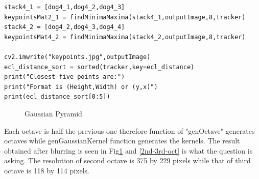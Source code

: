 \documentclass[12pt]{article}
\newenvironment{QandA}
{
	\begin{enumerate}[label=\normalfont\arabic*.,leftmargin=2em,rightmargin=2em]\normalfont
	}
	{
	\end{enumerate}
}
\newenvironment{codelalala}{}{}
\newenvironment{answered}{\setlength{\parindent}{1em}\par\normalfont}{}
\begin{document}
\begin{QandA}
\begin{answered}
\begin{codelalala}
\begin{verbatim}
stack4_1 = [dog4_1,dog4_2,dog4_3]
keypointsMat2_1 = findMinimaMaxima(stack4_1,outputImage,8,tracker)
stack4_2 = [dog4_2,dog4_3,dog4_4]
keypointsMat4_2 = findMinimaMaxima(stack4_2,outputImage,8,tracker)

cv2.imwrite("keypoints.jpg",outputImage)
ecl_distance_sort = sorted(tracker,key=ecl_distance)
print("Closest five points are:")
print("Format is (Height,Width) or (y,x)")
print(ecl_distance_sort[0:5])
\end{verbatim}
\end{codelalala}
\begin{figure}
		\centering
  			\caption{Gaussian Pyramid}
  		\label{gaussian-blurring}
\end{figure}
Each octave is half the previous one therefore function of "genOctave" generates octaves while genGaussianKernel function generates the kernels. The result obtained after blurring is seen in Fig{\ref{gaussian-blurring}} and {\ref{2nd-3rd-oct}} is what the question is asking. The resolution of second octave is 375 by 229 pixels while that of third octave is 118 by 114 pixels. 

\end{answered}
\end{QandA}
\end{document}
